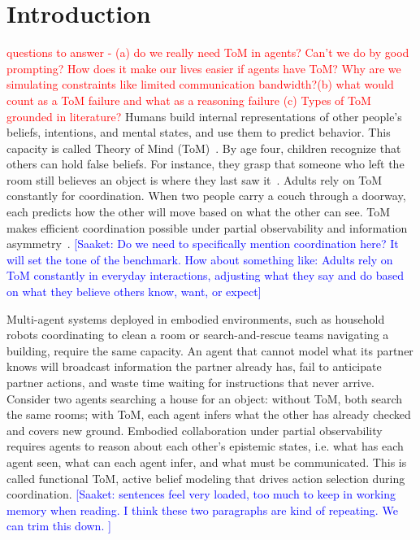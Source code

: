 \documentclass{article} %
\newcommand{\saaket}[1]{\textcolor{blue}{[Saaket: #1]}}
\newcommand{\g}[1]{\textcolor{red}{#1}}
\begin{document}
\section{Introduction}
\label{sec:introduction}
\g{questions to answer - (a) do we really need ToM in agents? Can't we do by good prompting? How does it make our lives easier if agents have ToM? Why are we simulating constraints like limited communication bandwidth?(b) what would count as a ToM failure and what as a reasoning failure (c) Types of ToM grounded in literature? }
Humans build internal representations of other people's beliefs, intentions, and mental states, and use them to predict behavior. This capacity is called Theory of Mind (ToM)~\citep{premack1978does, wimmer1983beliefs}. By age four, children recognize that others can hold false beliefs. For instance, they grasp that someone who left the room still believes an object is where they last saw it~\citep{wimmer1983beliefs, tomasello2005understanding}. Adults rely on ToM constantly for coordination. When two people carry a couch through a doorway, each predicts how the other will move based on what the other can see. ToM makes efficient coordination possible under partial observability and information asymmetry~\citep{tomasello2005understanding, bratman1992shared}. \saaket{Do we need to specifically mention coordination here? It will set the tone of the benchmark. How about something like: Adults rely on ToM constantly in everyday interactions, adjusting what they say and do based on what they believe others know, want, or expect}

Multi-agent systems deployed in embodied environments, such as household robots coordinating to clean a room or search-and-rescue teams navigating a building, require the same capacity. An agent that cannot model what its partner knows will broadcast information the partner already has, fail to anticipate partner actions, and waste time waiting for instructions that never arrive. 
Consider two agents searching a house for an object: without ToM, both search the same rooms; with ToM, each agent infers what the other has already checked and covers new ground. 
Embodied collaboration under partial observability requires agents to reason about each other's epistemic states, i.e. what has each agent seen, what can each agent infer, and what must be communicated. This is called functional ToM, active belief modeling that drives action selection during coordination. \saaket{sentences feel very loaded, too much to keep in working memory when reading. I think these two paragraphs are kind of repeating. We can trim this down. }
\end{document}
